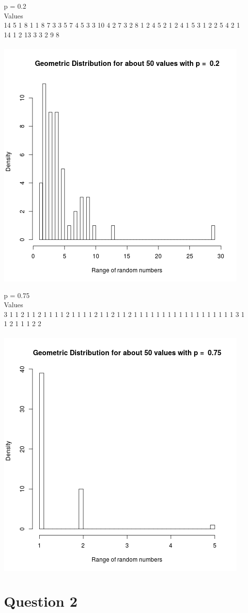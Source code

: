 \documentclass{article}
\begin{document}
p = 0.2\\
Values\\
14  5  1  8  1  1  8  7  3  3  5  7  4  5  3  3 10  4  2  7  3  2  8  1  2 
 4  5  2  1  2  4  1  5  3  1  2  2  5  4  2  1 14  1  2 13  3  3  2  9  8\\\\
\includegraphics{"plot1_2"}
\pagebreak

p = 0.75\\
Values\\
3 1 1 2 1 1 2 1 1 1 1 2 1 1 1 1 2 1 1 2 1 1 2 1 1 1 1 1 1 1 1 1 1 1 1 1 1 1 
1 1 1 3 1 1 2 1 1 1 2 2\\\\
\includegraphics{"plot1_3"}
\pagebreak






\section{Question 2}


\begin{lstlisting}

\end{lstlisting}
\end{document}
